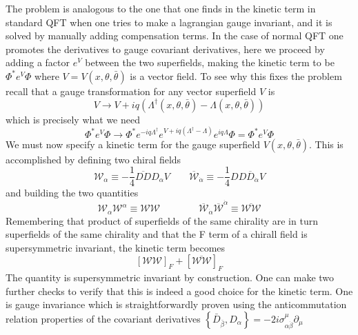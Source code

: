 \documentclass[12pt]{article}
\begin{document}
The problem is analogous to the one that one finds in the kinetic term in standard QFT when one tries to make a lagrangian gauge invariant, and it is solved by manually adding compensation terms. In the case of normal QFT one
promotes the derivatives to gauge covariant derivatives, here we proceed by adding a factor $e^V$ between the two superfields, making the kinetic term to be $\Phi^* e^V \Phi$ where $V=V(x,\theta,\bar\theta)$ is a vector field. To see why this fixes the problem recall that a gauge transformation for any vector superfield $V$ is
\begin{equation*}
  V \to V + iq\left(\Lambda^\dagger(x, \theta, \bar\theta) - \Lambda(x, \theta, \bar\theta)\right)
\end{equation*}
which is precisely what we need
\begin{equation*}
  \Phi^* e^V \Phi \to \Phi^* e^{-iq\Lambda^\dagger } e^{V + iq(\Lambda^\dagger - \Lambda)} e^{iq\Lambda} \Phi = \Phi^* e^V \Phi
\end{equation*}
We must now specify a kinetic term for the gauge superfield $V(x, \theta, \bar\theta)$. This is accomplished by defining two chiral fields 
\begin{equation*}
  \mathcal{W_\alpha} \equiv -\frac{1}{4}\overline{DD}D_\alpha V \qquad \overline{\mathcal{W}}_{\dot\alpha} \equiv -\frac{1}{4}DD \overline{D}_{\dot\alpha} V
\end{equation*}
and building the two quantities
\begin{equation*}
  \mathcal{W}_{\alpha} \mathcal{W}^{\alpha} \equiv \mathcal{W}\mathcal{W} \qquad\qquad \overline{\mathcal{W}}_{\dot\alpha} \overline{\mathcal{W}}^{\dot\alpha} \equiv \overline{\mathcal{W}\mathcal{W}}
\end{equation*}
Remembering that product of superfields of the same chirality are in turn superfields of the same chirality and that the F term of a chirall field is supersymmetric invariant, the kinetic term becomes 
\begin{equation*}
  \left[\mathcal{W}\mathcal{W}\right]_F + \left[\overline{\mathcal{W}\mathcal{W}}\right]_F
\end{equation*}
The quantity is supersymmetric invariant by construction. One can make two further checks to verify that this is indeed a good choice for the kinetic term. One is gauge invariance which is straightforwardly proven using the anticommutation relation properties of the covariant derivatives $\left\{\bar{D}_{\bar\beta}, D_{\alpha}\right\}= - 2 i \sigma_{\alpha \dot{\beta}}^{\mu} \partial_{\mu}$
\end{document}
